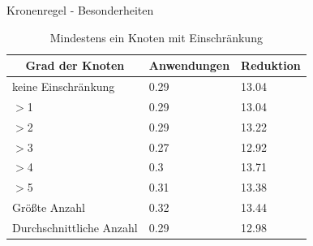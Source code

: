 \documentclass{beamer}
\begin{document}
\begin{frame}{Kronenregel - Besonderheiten}

\begin{table}[htb]
\caption{Mindestens ein Knoten mit Einschränkung\label{tab:degreeOR}}
\vspace*{1em}
\centering

\bgroup
\def\arraystretch{1.3}%


\begin{tabular}[c]{l|l|l}
	
	\multicolumn{1}{c|}{\textbf{Grad der Knoten}} & 
	\multicolumn{1}{c|}{\textbf{Anwendungen}} & 
	\multicolumn{1}{c}{\textbf{Reduktion}} \\ 
	
	\hline

	keine Einschränkung&0.29&13.04\\
	$>$1&0.29 &13.04 \\
	$>$2&0.29 &13.22 \\
	$>$3& 0.27& 12.92 \\
	$>$4& 0.3& 13.71 \\
	$>$5& 0.31&13.38 \\  
	Größte Anzahl& 0.32&13.44 \\
	Durchschnittliche Anzahl& 0.29&12.98 \\
	
\end{tabular}


\egroup

\end{table}

\end{frame}
\end{document}
